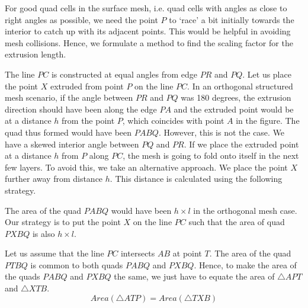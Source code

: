 \documentclass[conf]{new-aiaa}
\begin{document}
For good quad cells in the surface mesh, i.e. quad cells with angles as close to right angles as possible, we need the point $P$ to `race' a bit initially towards the interior to catch up with its adjacent points. This would be helpful in avoiding mesh collisions. Hence, we formulate a method to find the scaling factor for the extrusion length.

The line $\mathit{PC}$ is constructed at equal angles from edge $\mathit{PR}$ and $\mathit{PQ}$. Let us place the point $\mathit{X}$ extruded from point $P$ on the line $\mathit{PC}$. In an orthogonal structured mesh scenario, if the angle between $\mathit{PR}$ and $\mathit{PQ}$ was 180 degrees, the extrusion direction should have been along the edge $\mathit{PA}$ and the extruded point would be at a distance $\mathit{h}$ from the point $\mathit{P}$, which coincides with point $\mathit{A}$ in the figure. The quad thus formed would have been $\mathit{PABQ}$. However, this is not the case. We have a skewed interior angle between $\mathit{PQ}$ and $\mathit{PR}$. If we place the extruded point at a distance $\mathit{h}$ from $\mathit{P}$ along $\mathit{PC}$, the mesh is going to fold onto itself in the next few layers. To avoid this, we take an alternative approach. We place the point $\mathit{X}$ further away from distance $\mathit{h}$. This distance is calculated using the following strategy.

The area of the quad $\mathit{PABQ}$ would have been $h\times l$ in the orthogonal mesh case. Our strategy is to put the point $\mathit{X}$ on the line $\mathit{PC}$ such that the area of quad $\mathit{PXBQ}$ is also $\mathit{h\times l}$.

Let us assume that the line $\mathit{PC}$ intersects $\mathit{AB}$ at point $\mathit{T}$. The area of the quad $\mathit{PTBQ}$ is common to both quads $\mathit{PABQ}$ and $\mathit{PXBQ}$. Hence, to make the area of the quads $\mathit{PABQ}$ and $\mathit{PXBQ}$ the same, we just have to equate the area of $\mathit{\bigtriangleup APT}$ and $\mathit{\bigtriangleup XTB}$.
\begin{equation}
    Area(\mathit{\bigtriangleup ATP}) = Area(\mathit{\bigtriangleup TXB})
    \label{eqn:area-constraint}
\end{equation}
\end{document}
